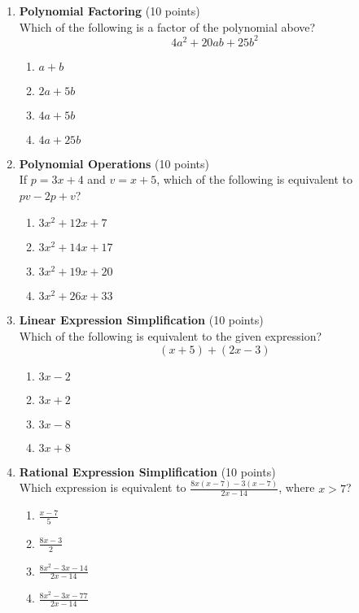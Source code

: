 \begin{enumerate}
  \item \textbf{Polynomial Factoring} (10 points)\\
  Which of the following is a factor of the polynomial above?
  \[
  4 a^{2}+20 a b+25 b^{2}
  \]
  \begin{enumerate}[label=(\Alph*)]
    \item $a+b$
    \item $2 a+5 b$
    \item $4 a+5 b$
    \item $4 a+25 b$
  \end{enumerate}
  \begin{subanswer}
  \end{subanswer}

  \item \textbf{Polynomial Operations} (10 points)\\
  If $p=3 x+4$ and $v=x+5$, which of the following is equivalent to $p v-2 p+v$?
  \begin{enumerate}[label=(\Alph*)]
    \item $3 x^{2}+12 x+7$
    \item $3 x^{2}+14 x+17$
    \item $3 x^{2}+19 x+20$
    \item $3 x^{2}+26 x+33$
  \end{enumerate}
  \begin{subanswer}
  \end{subanswer}

  \item \textbf{Linear Expression Simplification} (10 points)\\
  Which of the following is equivalent to the given expression?
  \[
  (x+5)+(2 x-3)
  \]
  \begin{enumerate}[label=(\Alph*)]
    \item $3 x-2$
    \item $3 x+2$
    \item $3 x-8$
    \item $3 x+8$
  \end{enumerate}
  \begin{subanswer}
  \end{subanswer}

  \newpage

  \item \textbf{Rational Expression Simplification} (10 points)\\
  Which expression is equivalent to $\frac{8 x(x-7)-3(x-7)}{2 x-14}$, where $x>7$?
  \begin{enumerate}[label=(\Alph*)]
    \item $\frac{x-7}{5}$
    \item $\frac{8 x-3}{2}$
    \item $\frac{8 x^{2}-3 x-14}{2 x-14}$
    \item $\frac{8 x^{2}-3 x-77}{2 x-14}$
  \end{enumerate}
  \begin{subanswer}
  \end{subanswer}


\end{enumerate}
